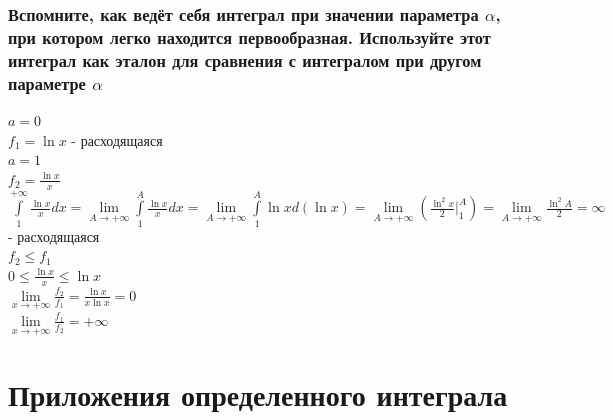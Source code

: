 \documentclass{article}
\begin{document}
\subsubsection{Вспомните, как ведёт себя интеграл при значении параметра $ \alpha $, при котором легко находится первообразная. Используйте этот интеграл как эталон для сравнения с интегралом при другом параметре $ \alpha $}
$ a = 0 $\\
$ f_1 = \ln{x} $ - расходящаяся\\
$ a = 1 $\\
$ f_2 = \frac{\ln{x}}{x} $\\
$ \int\limits^{+\infty}_1 \frac{\ln{x}}{x}dx = \lim\limits_{A\to +\infty} \int\limits^A_1 \frac{\ln{x}}{x}dx = \lim\limits_{A\to +\infty} \int\limits^A_1 \ln{x}d(\ln{x}) = \lim\limits_{A\to +\infty} (\frac{\ln^2{x}}{2} |^A_1) = \lim\limits_{A\to +\infty} \frac{\ln^2{A}}{2} = \infty $ - расходящаяся\\
$ f_2 \le f_1 $\\
$ 0 \le \frac{\ln{x}}{x} \le \ln{x} $\\
$ \lim\limits_{x\to +\infty} \frac{f_2}{f_1} = \frac{\ln{x}}{x\ln{x}} = 0 $\\
$ \lim\limits_{x\to +\infty} \frac{f_1}{f_2} = +\infty $
\newpage
\Large
\section{Приложения определенного интеграла}
\normalsize
\end{document}
